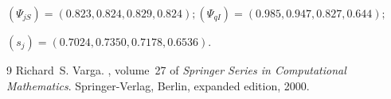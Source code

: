 \documentclass[12pt]{amsart}
\theoremstyle{definition}
\begin{document}
$(\Psi_{jS})=
(0.823, 0.824, 0.829, 0.824);
(\Psi_{qI})=(0.985, 0.947, 0.827, 0.644);$

$(s_j)=(0.7024, 0.7350, 0.7178, 0.6536).$




\begin{thebibliography}{9}
Richard~S. Varga.
, volume~27 of {\em Springer Series in Computational Mathematics}.
\newblock Springer-Verlag, Berlin, expanded edition, 2000.

\end{thebibliography}



\newpage
\end{document}
